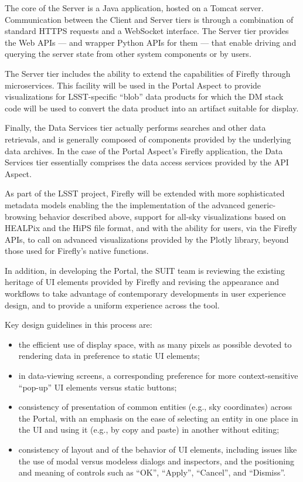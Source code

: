 The core of the Server is a Java application, hosted on a Tomcat server.
Communication between the Client and Server tiers is through a combination of standard HTTPS requests and a WebSocket interface.
The Server tier provides the Web APIs --- and wrapper Python APIs for them --- that enable driving and querying the server state from other system components or by users.

The Server tier includes the ability to extend the capabilities of Firefly through microservices.
This facility will be used in the Portal Aspect to provide visualizations for LSST-specific ``blob'' data products for which the DM stack code will be used to convert the data product into an artifact suitable for display.

Finally, the Data Services tier actually performs searches and other data retrievals, and is generally composed of components provided by the underlying data archives.
In the case of the Portal Aspect's Firefly application, the Data Services tier essentially comprises the data access services provided by the API Aspect.

As part of the LSST project, Firefly will be extended with more sophisticated metadata models enabling the the implementation of the advanced generic-browsing behavior described above, support for all-sky visualizations based on HEALPix and the HiPS file format, and with the ability for users, via the Firefly APIs, to call on advanced visualizations provided by the Plotly library, beyond those used for Firefly's native functions.

In addition, in developing the Portal, the SUIT team is reviewing the existing heritage of UI elements provided by Firefly and revising the appearance and workflows to take advantage of contemporary developments in user experience design, and to provide a uniform experience across the tool.

Key design guidelines in this process are:
\begin{itemize}
\item the efficient use of display space, with as many pixels as possible devoted to rendering data in preference to static UI elements;
\item in data-viewing screens, a corresponding preference for more context-sensitive ``pop-up'' UI elements versus static buttons;
\item consistency of presentation of common entities (e.g., sky coordinates) across the Portal, with an emphasis on the ease of selecting an entity in one place in the UI and using it (e.g., by copy and paste) in another without editing;
\item consistency of layout and of the behavior of UI elements, including issues like the use of modal versus modeless dialogs and inspectors, and the positioning and meaning of controls such as ``OK'', ``Apply'', ``Cancel'', and ``Dismiss''.
\end{itemize}

